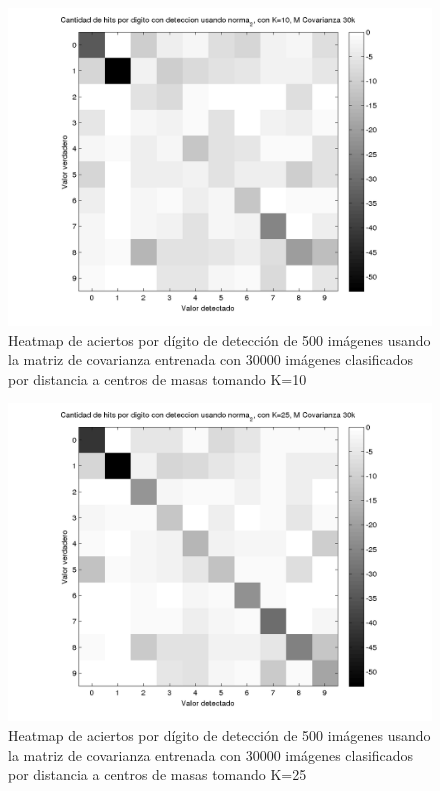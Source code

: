 \begin{figure}[H]
\includegraphics[width=\hmwidth]{plots/heatmap-30kcv-k10-norma_2.png}
\caption{Heatmap de aciertos por d\'igito de detecci\'on de 500 im\'agenes usando la matriz de covarianza entrenada con 30000 im\'agenes
clasificados por distancia a centros de masas tomando K=10 }
\label{fig:HM30kcv-k10}
\end{figure}

\begin{figure}[H]
\includegraphics[width=\hmwidth]{plots/heatmap-30kcv-k25-norma_2.png}
\caption{Heatmap de aciertos por d\'igito de detecci\'on de 500 im\'agenes usando la matriz de covarianza entrenada con 30000 im\'agenes
clasificados por distancia a centros de masas tomando K=25 }
\label{fig:HM30kcv-k25}
\end{figure}

